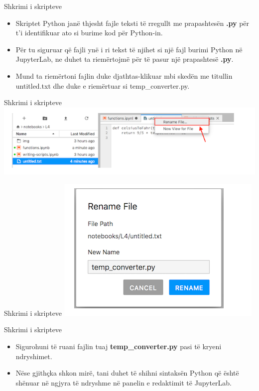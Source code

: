 \documentclass[
  ignorenonframetext,
]{beamer}
\begin{document}
\begin{frame}{Shkrimi i skripteve}
\protect\hypertarget{shkrimi-i-skripteve-6}{}
\begin{itemize}
\item
  Skriptet Python janë thjesht fajle teksti të rregullt me prapashtesën
  \textbf{.py} për t'i identifikuar ato si burime kod për Python-in.
\item
  Për tu siguruar që fajli ynë i ri tekst të njihet si një fajl burimi
  Python në JupyterLab, ne duhet ta riemërtojmë për të pasur një
  prapashtesë \textbf{.py}.
\item
  Mund ta riemërtoni fajlin duke djathtas-klikuar mbi skedën me titullin
  untitled.txt dhe duke e riemërtuar si temp\_converter.py.
\end{itemize}
\end{frame}

\begin{frame}{Shkrimi i skripteve}
\protect\hypertarget{shkrimi-i-skripteve-7}{}
\includegraphics{./Figs/script3.png}
\end{frame}

\begin{frame}{Shkrimi i skripteve}
\protect\hypertarget{shkrimi-i-skripteve-8}{}
\includegraphics{./Figs/script4.png}
\end{frame}

\begin{frame}{Shkrimi i skripteve}
\protect\hypertarget{shkrimi-i-skripteve-9}{}
\begin{itemize}
\item
  Sigurohuni të ruani fajlin tuaj \textbf{temp\_converter.py} pasi të
  kryeni ndryshimet.
\item
  Nëse gjithçka shkon mirë, tani duhet të shihni sintaksën Python që
  është shënuar në ngjyra të ndryshme në panelin e redaktimit të
  JupyterLab.
\end{itemize}
\end{frame}
\end{document}
